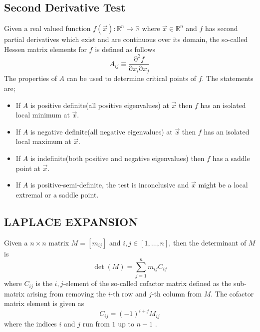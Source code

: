 \documentclass[a4paper, hidelinks, 10pt]{article}
\let\oldsubsection\subsection
\renewcommand{\subsection}[1]{\centering \oldsubsection{{#1}} \justifying}
\newcommand{\prtl}{\mathrm{\partial}} %
\newcommand{\rarr}{\rightarrow} %
\newcommand{\suml}[2]{\sum\limits_{#1=1}^{#2}}
\begin{document}
\subsection{Second Derivative Test}
\label{sub:second_derivative_test}
    Given a real valued function $f(\vec{x}):\mathbb{R}^n\rarr\mathbb{R}$ where
    $\vec{x}\in\mathbb{R}^n$ and $f$ has second partial derivatives which exist
    and are continuous over its domain, the so-called Hessen matrix elements
    for $f$ is defined as follows \cite{linalgDavid}
        \begin{equation}
            A_{ij} \equiv \frac{\prtl^2f}{\prtl x_i\prtl x_j}
            \label{eq:hessendef}
        \end{equation}
    The properties of $A$ can be used to determine critical points of $f$. The
    statements are;
        \begin{itemize}
            \item If $A$ is positive definite(all positive eigenvalues) at
                $\vec{x}$ then $f$ has an isolated  local minimum at $\vec{x}$.
            \item If $A$ is negative definite(all negative eigenvalues) at
                $\vec{x}$ then $f$ has an isolated  local maximum at $\vec{x}$.
            \item If $A$ is indefinite(both positive and negative eigenvalues)
                then $f$ has a saddle point at $\vec{x}$.
            \item If $A$ is positive-semi-definite, the test is inconclusive
                and $\vec{x}$ might be a local extremal or a saddle point.
        \end{itemize}


\subsection{LAPLACE EXPANSION}
\label{sub:laplace_expansion}
    Given a $n\times n$ matrix $M=[m_{ij}]$ and $i,j\in[1,\dots,n]$, then the
    determinant of $M$ is
        \begin{equation}
            \det(M) = \suml{j}{n}m_{ij}C_{ij}
            \label{eq:laplaceexp}
        \end{equation}
    where $C_{ij}$ is the $i,j$-element of the so-called cofactor matrix
    defined as the sub-matrix arising from removing the $i$-th row and $j$-th
    column from $M$. The cofactor matrix element is given as
        \begin{equation}
            C_{ij} = (-1)^{i+j}M_{ij}
            \label{eq:cofactor}
        \end{equation}
    where the indices $i$ and $j$ run from $1$ up to $n-1$ \cite{linalgDavid}.
\end{document}
